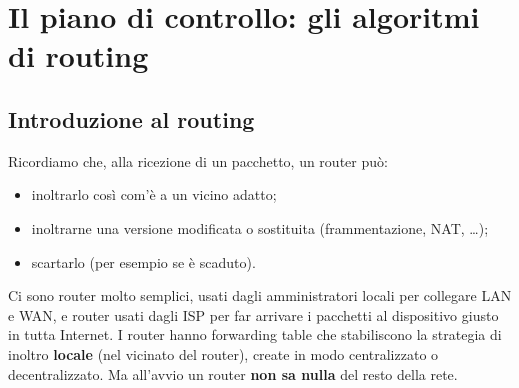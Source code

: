 \chapter{Il piano di controllo: gli algoritmi di routing}

\newcommand{\grafoesempio}[1]{%
  \node[rnode] (u) at (0,0) {u};
  \node[rnode] (v) at (1.8,1.4) {v};
  \node[rnode] (w) at (4.2,1.4) {w};
  \node[rnode] (x) at (1.8,-1.4) {x};
  \node[rnode] (y) at (4.2,-1.4) {y};
  \node[rnode] (z) at (6,0) {z};
  \draw[redge] (u) -- node[rcost] {2} (v);
  \draw[redge] (u) -- node[rcost] {1} (x);
  \draw[redge] (u) -- node[rcost, pos=0.35] {5} (w);
  \draw[redge] (v) -- node[rcost] {3} (w);
  \draw[redge] (v) -- node[rcost] {2} (x);
  \draw[redge] (x) -- node[rcost, pos=0.35] {3} (w);
  \draw[redge] (x) -- node[rcost] {1} (y);
  \draw[redge] (w) -- node[rcost] {1} (y);
  \draw[redge] (w) -- node[rcost] {5} (z);
  \draw[redge] (y) -- node[rcost] {2} (z);
  #1
}

\section{Introduzione al routing}

Ricordiamo che, alla ricezione di un pacchetto, un router può:

\begin{itemize}
    \item inoltrarlo così com'è a un vicino adatto;
    \item inoltrarne una versione modificata o sostituita (frammentazione, NAT, \dots);
    \item scartarlo (per esempio se è scaduto).
\end{itemize}

Ci sono router molto semplici, usati dagli amministratori locali per collegare LAN e WAN, e router usati dagli ISP per
far arrivare i pacchetti al dispositivo giusto in tutta Internet. I router hanno forwarding table che stabiliscono la
strategia di inoltro \textbf{locale} (nel vicinato del router), create in modo centralizzato o decentralizzato. Ma
all'avvio un router \textbf{non sa nulla} del resto della rete.

